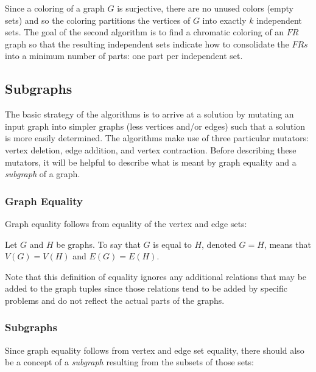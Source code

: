Since a  coloring of a graph \(G\) is surjective, there are no unused colors (empty sets) and so the
coloring partitions the vertices of \(G\) into exactly \(k\) independent sets.  The goal of the second algorithm is
to find a chromatic coloring of an \(FR\) graph so that the resulting independent sets indicate how to consolidate
the \(FRs\) into a minimum number of parts: one part per independent set.

\subsection{Subgraphs}

The basic strategy of the algorithms is to arrive at a solution by mutating an input graph into simpler graphs
(less vertices and/or edges) such that a solution is more easily determined.  The algorithms make use of three
particular mutators: vertex deletion, edge addition, and vertex contraction.  Before describing these mutators, it
will be helpful to describe what is meant by graph equality and a \emph{subgraph} of a graph.

\subsubsection{Graph Equality}

Graph equality follows from equality of the vertex and edge sets:

\begin{definition}
  Let \(G\) and \(H\) be graphs.  To say that \(G\) is equal to \(H\), denoted \(G=H\), means that \(V(G)=V(H)\)
  and \(E(G)=E(H)\).
\end{definition}

Note that this definition of equality ignores any additional relations that may be added to the graph tuples since
those relations tend to be added by specific problems and do not reflect the actual parts of the graphs.

\subsubsection{Subgraphs}

Since graph equality follows from vertex and edge set equality, there should also be a concept of a \emph{subgraph}
resulting from the subsets of those sets:

